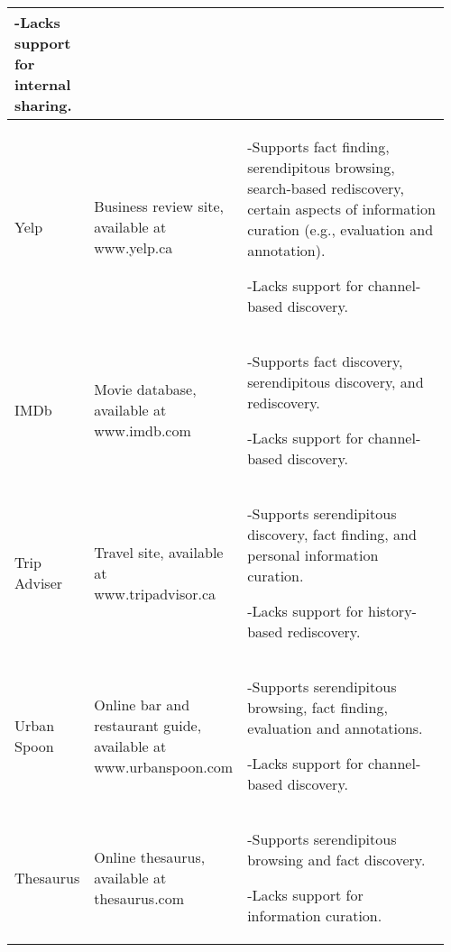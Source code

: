 \begin{longtable}{|p{0.16\linewidth}| p{0.30\linewidth}| p{0.50\linewidth}|}
-\hspace{0.4cm}Lacks support for internal sharing.                                                                                                                                                \\
\hline
Yelp            & \raggedright Business review site, available at www.yelp.ca                               & -\hspace{0.4cm}Supports fact finding, serendipitous browsing, search-based rediscovery, certain aspects of information curation (e.g., evaluation and annotation).                                                                                                

 -\hspace{0.4cm}Lacks support for channel-based discovery.   \\
\hline
IMDb            & \raggedright Movie database, available at www.imdb.com                                    & -\hspace{0.4cm}Supports fact discovery, serendipitous discovery, and rediscovery. 

-\hspace{0.4cm}Lacks support for channel-based discovery.                                                                                                                                                          \\
\hline
Trip Adviser    & \raggedright Travel site, available at www.tripadvisor.ca                                 & -\hspace{0.4cm}Supports serendipitous discovery, fact finding, and personal information curation. 

-\hspace{0.4cm}Lacks support for history-based rediscovery.                                                                                                                                 \\
\hline
Urban Spoon     & \raggedright Online bar and restaurant guide, available at www.urbanspoon.com             & -\hspace{0.4cm}Supports serendipitous browsing, fact finding, evaluation and annotations. 

-\hspace{0.4cm}Lacks support for channel-based discovery.  \\
\hline
Thesaurus       & \raggedright Online thesaurus, available at thesaurus.com                                 & -\hspace{0.4cm}Supports serendipitous browsing and fact discovery. 

-\hspace{0.4cm}Lacks support for information curation.                                                                                \\
\hline
\end{longtable}
